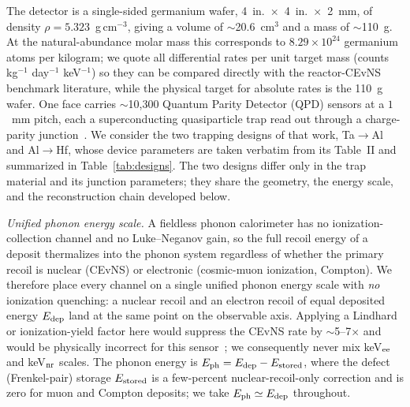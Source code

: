The detector is a single-sided germanium wafer, 4~in.\ $\times$~4~in.\ $\times$~2~mm, of density $\rho = 5.323$~g\,cm$^{-3}$, giving a volume of $\sim$20.6~cm$^3$ and a mass of $\sim$110~g. At the natural-abundance molar mass this corresponds to $8.29\times10^{24}$ germanium atoms per kilogram; we quote all differential rates per unit target mass (counts kg$^{-1}$ day$^{-1}$ keV$^{-1}$) so they can be compared directly with the reactor-CEvNS benchmark literature, while the physical target for absolute rates is the 110~g wafer. One face carries $\sim$10{,}300 Quantum Parity Detector (QPD) sensors at a $1$~mm pitch, each a superconducting quasiparticle trap read out through a charge-parity junction~\cite{ramanathan2026}. We consider the two trapping designs of that work, Ta$\to$Al and Al$\to$Hf, whose device parameters are taken verbatim from its Table~II and summarized in Table~\ref{tab:designs}. The two designs differ only in the trap material and its junction parameters; they share the geometry, the energy scale, and the reconstruction chain developed below.

\emph{Unified phonon energy scale.} A fieldless phonon calorimeter has no ionization-collection channel and no Luke--Neganov gain, so the full recoil energy of a deposit thermalizes into the phonon system regardless of whether the primary recoil is nuclear (CEvNS) or electronic (cosmic-muon ionization, Compton). We therefore place every channel on a single unified phonon energy scale with \emph{no} ionization quenching: a nuclear recoil and an electron recoil of equal deposited energy $E_{\rm dep}$ land at the same point on the observable axis. Applying a Lindhard or ionization-yield factor here would suppress the CEvNS rate by $\sim$5--7$\times$ and would be physically incorrect for this sensor~\cite{freedman1974}; we consequently never mix keV$_{\rm ee}$ and keV$_{\rm nr}$ scales. The phonon energy is $E_{\rm ph} = E_{\rm dep} - E_{\rm stored}$, where the defect (Frenkel-pair) storage $E_{\rm stored}$ is a few-percent nuclear-recoil-only correction and is zero for muon and Compton deposits; we take $E_{\rm ph}\simeq E_{\rm dep}$ throughout.

